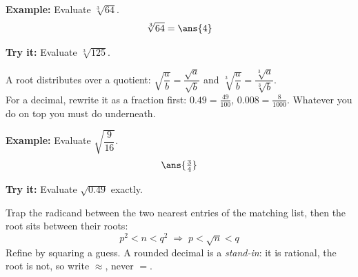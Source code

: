 \documentclass[12pt]{article}
\begin{document}
\begin{examplebox}
\textbf{Example:} Evaluate $\sqrt[3]{64}$.
\[ \sqrt[3]{64} = \ans{4} \]
\end{examplebox}

\begin{tryitbox}
\textbf{Try it:} Evaluate $\sqrt[3]{125}$.\\[2pt]
\end{tryitbox}


\begin{formulabox}
A root distributes over a quotient:
$\sqrt{\dfrac{a}{b}} = \dfrac{\sqrt{a}}{\sqrt{b}}$ and
$\sqrt[3]{\dfrac{a}{b}} = \dfrac{\sqrt[3]{a}}{\sqrt[3]{b}}$.\\[2pt]
For a decimal, rewrite it as a fraction first: $0.49 = \frac{49}{100}$,
$0.008 = \frac{8}{1000}$. Whatever you do on top you must do underneath.
\end{formulabox}

\begin{examplebox}
\textbf{Example:} Evaluate $\sqrt{\dfrac{9}{16}}$.
\[ \ans{\tfrac{3}{4}} \]
\end{examplebox}

\begin{tryitbox}
\textbf{Try it:} Evaluate $\sqrt{0.49}$ exactly.\\[2pt]
\end{tryitbox}


\begin{formulabox}
Trap the radicand between the two nearest entries of the matching list, then the
root sits between their roots:
\[ p^2 < n < q^2 \;\Longrightarrow\; p < \sqrt{n} < q \]
Refine by squaring a guess. A rounded decimal is a \emph{stand-in}: it is
rational, the root is not, so write $\approx$, never $=$.
\end{formulabox}
\end{document}
